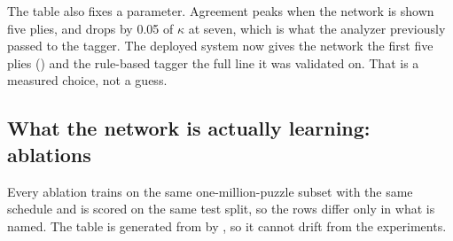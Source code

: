 The table also fixes a parameter. Agreement peaks when the network is shown five plies, and drops by
0.05 of $\kappa$ at seven, which is what the analyzer previously passed to the tagger. The deployed
system now gives the network the first five plies () and the
rule-based tagger the full line it was validated on. That is a measured choice, not a guess.

\subsection{What the network is actually learning: ablations}\label{sec:nn-ablations}

Every ablation trains on the same one-million-puzzle subset with the same schedule and is scored on
the same test split, so the rows differ only in what is named. The table is generated from
 by , so it
cannot drift from the experiments.


